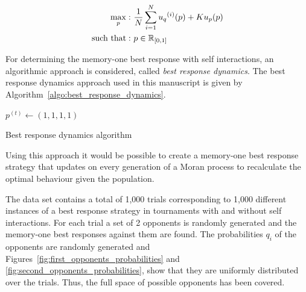 \begin{equation}\label{eq:mo_evolutionary_optimisation}
    \begin{aligned}
    \max_p: & \ \frac{1}{N} \sum\limits_{i=1} ^ {N} {u_q}^{(i)} (p) + Ku_p(p)
    \\
    \text{such that}: & \ p \in \mathbb{R}_{[0, 1]}
    \end{aligned}
   \end{equation}

For determining the memory-one best response with self interactions, an
algorithmic approach is considered, called \textit{best response dynamics}. The
best response dynamics approach used in this manuscript is given by
Algorithm~\ref{algo:best_response_dynamics}.

\begin{algorithm}[H]
    $p^{(t)}\leftarrow (1, 1, 1, 1)$\;
    \caption{Best response dynamics algorithm}
    \label{algo:best_response_dynamics}
 \end{algorithm}

Using this approach it would be possible to create a memory-one best response
strategy that updates on every generation of a Moran process to recalculate the
optimal behaviour given the population.

The data set contains a total of 1,000 trials corresponding to 1,000 different
instances of a best response strategy in tournaments with and without self
interactions. For each trial a set of 2 opponents is randomly generated and the
memory-one best responses against them are found. The probabilities \(q_i\) of
the opponents are randomly generated and
Figures~\ref{fig:first_opponents_probabilities} and
\ref{fig:second_opponents_probabilities}, show that they are uniformly
distributed over the trials. Thus, the full space of possible opponents has been
covered.

